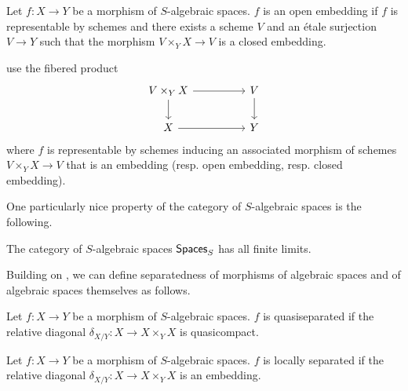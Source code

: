 \begin{definition}\label{def: closed embedding of algebraic spaces}
    Let $f:X\to Y$ be a morphism of $S$-algebraic spaces. $f$ is an open embedding if $f$ is representable by schemes and there exists a scheme $V$ and an \'{e}tale surjection $V\to Y$ such that the morphism $V\times_{Y}X\to V$ is a closed embedding.
\end{definition}
\begin{remark}
     use the fibered product 
    $$%
    \begin{tikzcd}
        {V\times_{Y}X} && V \\
        X && Y
        \arrow[from=1-3, to=2-3]
        \arrow[from=2-1, to=2-3]
        \arrow[from=1-1, to=1-3]
        \arrow[from=1-1, to=2-1]
    \end{tikzcd}$$
    where $f$ is representable by schemes inducing an associated morphism of schemes $V\times_{Y}X\to V$ that is an embedding (resp. open embedding, resp. closed embedding). 
\end{remark}
One particularly nice property of the category of $S$-algebraic spaces is the following. 
\begin{proposition}\label{prop: spaces has all colimits}
    The category of $S$-algebraic spaces $\mathsf{Spaces}_{S}$ has all finite limits. 
\end{proposition}
Building on , we can define separatedness of morphisms of algebraic spaces and of algebraic spaces themselves as follows. 
\begin{definition}\label{def: quasiseparated morphism of spaces}
    Let $f:X\to Y$ be a morphism of $S$-algebraic spaces. $f$ is quasiseparated if the relative diagonal $\delta_{X/Y}:X\to X\times_{Y}X$ is quasicompact. 
\end{definition}
\begin{definition}\label{def: locally separated morphism of spaces}
    Let $f:X\to Y$ be a morphism of $S$-algebraic spaces. $f$ is locally separated if the relative diagonal $\delta_{X/Y}:X\to X\times_{Y}X$ is an embedding.
\end{definition}
